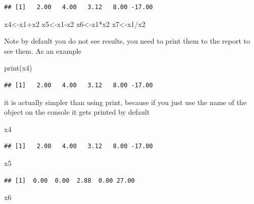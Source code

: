 \documentclass[
]{article}
\newenvironment{Shaded}{\begin{snugshade}}{\end{snugshade}}
\newcommand{\FunctionTok}[1]{\textcolor[rgb]{0.00,0.00,0.00}{#1}}
\newcommand{\NormalTok}[1]{#1}
\newcommand{\OtherTok}[1]{\textcolor[rgb]{0.56,0.35,0.01}{#1}}
\newcommand{\SpecialCharTok}[1]{\textcolor[rgb]{0.00,0.00,0.00}{#1}}
\begin{document}
\begin{verbatim}
## [1]   2.00   4.00   3.12   8.00 -17.00
\end{verbatim}

\begin{Shaded}
\begin{Highlighting}[]
\NormalTok{x4}\OtherTok{\textless{}{-}}\NormalTok{x1}\SpecialCharTok{+}\NormalTok{x2}
\NormalTok{x5}\OtherTok{\textless{}{-}}\NormalTok{x1}\SpecialCharTok{{-}}\NormalTok{x2}
\NormalTok{x6}\OtherTok{\textless{}{-}}\NormalTok{x1}\SpecialCharTok{*}\NormalTok{x2}
\NormalTok{x7}\OtherTok{\textless{}{-}}\NormalTok{x1}\SpecialCharTok{/}\NormalTok{x2}
\end{Highlighting}
\end{Shaded}

Note by default you do not see results, you need to print them to the
report to see them. As an example

\begin{Shaded}
\begin{Highlighting}[]
\FunctionTok{print}\NormalTok{(x4)}
\end{Highlighting}
\end{Shaded}

\begin{verbatim}
## [1]   2.00   4.00   3.12   8.00 -17.00
\end{verbatim}

it is actually simpler than using print, because if you just use the
name of the object on the console it gets printed by default

\begin{Shaded}
\begin{Highlighting}[]
\NormalTok{x4}
\end{Highlighting}
\end{Shaded}

\begin{verbatim}
## [1]   2.00   4.00   3.12   8.00 -17.00
\end{verbatim}

\begin{Shaded}
\begin{Highlighting}[]
\NormalTok{x5}
\end{Highlighting}
\end{Shaded}

\begin{verbatim}
## [1]  0.00  0.00  2.88  0.00 27.00
\end{verbatim}

\begin{Shaded}
\begin{Highlighting}[]
\NormalTok{x6}
\end{Highlighting}
\end{Shaded}
\end{document}

